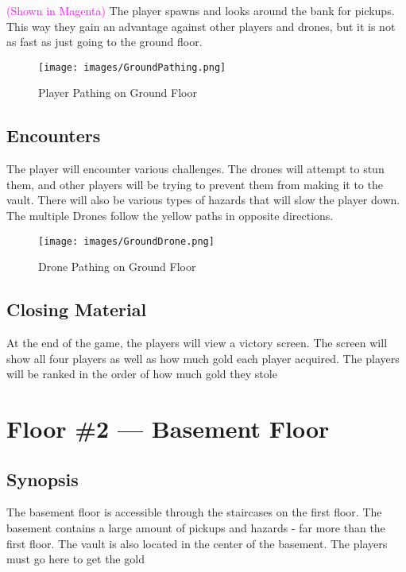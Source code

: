\documentclass[10pt]{report}
\begin{document}
\textcolor{magenta}{(Shown in Magenta)} The player spawns and looks around the bank for pickups. This way they gain an advantage against other players and drones, but it is not as fast as just going to the ground floor.

\begin{figure}[H]
    \centering
    \texttt{[image: images/GroundPathing.png]}
    \caption{Player Pathing on Ground Floor}
\end{figure}

\subsection{Encounters}

The player will encounter various challenges. The drones will attempt to stun them, and other players will be trying to prevent them from making it to the vault. There will also be various types of hazards that will slow the player down. The multiple Drones follow the yellow paths in opposite directions.

\begin{figure}[H]
    \centering
    \texttt{[image: images/GroundDrone.png]}
    \caption{Drone Pathing on Ground Floor}
\end{figure}

\subsection{Closing Material}

At the end of the game, the players will view a victory screen. The screen will show all four players as well as how much gold each player acquired. The players will be ranked in the order of how much gold they stole

\section{Floor \#2 --- Basement Floor}

\subsection{Synopsis}

The basement floor is accessible through the staircases on the first floor. The basement contains a large amount of pickups and hazards - far more than the first floor. The vault is also located in the center of the basement. The players must go here to get the gold
\end{document}
